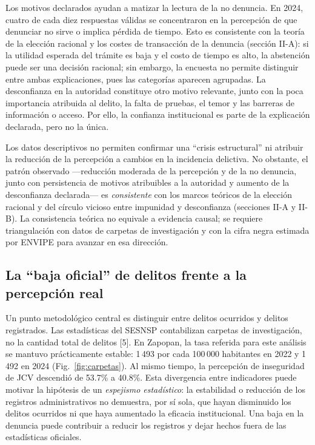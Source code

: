 \documentclass[10pt,twocolumn,letterpaper]{article}
\begin{document}
Los motivos declarados ayudan a matizar la lectura de la no denuncia. En
2024, cuatro de cada diez respuestas válidas se concentraron en la
percepción de que denunciar no sirve o implica pérdida de tiempo. Esto
es consistente con la teoría de la elección racional y los costes de
transacción de la denuncia (sección II-A): si la utilidad esperada del
trámite es baja y el costo de tiempo es alto, la abstención puede ser
una decisión racional; sin embargo, la encuesta no permite distinguir
entre ambas explicaciones, pues las categorías aparecen agrupadas. La
desconfianza en la autoridad constituye otro motivo relevante, junto con
la poca importancia atribuida al delito, la falta de pruebas, el temor y
las barreras de información o acceso. Por ello, la confianza
institucional es parte de la explicación declarada, pero no la única.

Los datos descriptivos no permiten confirmar una ``crisis estructural''
ni atribuir la reducción de la percepción a cambios en la incidencia
delictiva. No obstante, el patrón observado —reducción moderada de la
percepción y de la no denuncia, junto con persistencia de motivos
atribuibles a la autoridad y aumento de la desconfianza declarada— es
\textit{consistente} con los marcos teóricos de la elección racional y
del círculo vicioso entre impunidad y desconfianza (secciones II-A y
II-B). La consistencia teórica no equivale a evidencia causal; se
requiere triangulación con datos de carpetas de investigación y con la
cifra negra estimada por ENVIPE para avanzar en esa dirección.

\subsection{La ``baja oficial'' de delitos frente a la percepción real}

Un punto metodológico central es distinguir entre delitos ocurridos y
delitos registrados. Las estadísticas del SESNSP contabilizan carpetas
de investigación, no la cantidad total de delitos [5]. En Zapopan, la
tasa referida para este análisis se mantuvo prácticamente estable:
1\,493 por cada 100\,000 habitantes en 2022 y 1\,492 en 2024
(Fig.~\ref{fig:carpetas}). Al mismo tiempo, la percepción de inseguridad
de JCV descendió de 53.7\% a 40.8\%. Esta divergencia entre indicadores
puede motivar la hipótesis de un \textit{espejismo estadístico}: la
estabilidad o reducción de los registros administrativos no demuestra,
por sí sola, que hayan disminuido los delitos ocurridos ni que haya
aumentado la eficacia institucional. Una baja en la denuncia puede
contribuir a reducir los registros y dejar hechos fuera de las
estadísticas oficiales.
\end{document}
